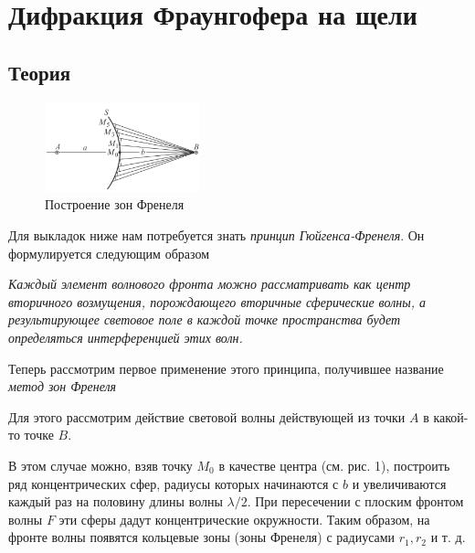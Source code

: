 \documentclass[a4paper, 12pt]{article}%
\begin{document}
\section{Дифракция Фраунгофера на щели}
\subsection*{Теория}
\begin{figure}
  \begin{center}
    \includegraphics[width = 0.4\textwidth]{2.png}
  \end{center}
  \caption{Построение зон Френеля}
\end{figure}
Для выкладок ниже нам потребуется знать \textit{принцип Гюйгенса-Френеля}. Он формулируется следующим образом

\textit{Каждый элемент волнового фронта можно рассматривать как центр  вторичного возмущения, порождающего вторичные сферические волны, а результирующее световое поле  в каждой точке пространства будет определяться интерференцией этих волн.}

Теперь рассмотрим первое применение этого принципа, получившее название \textit{метод зон Френеля}

Для этого рассмотрим действие световой волны действующей из точки $A$ в какой-то точке $B$.

В этом случае можно, взяв точку $M_0$ в качестве центра (см. рис. 1), построить ряд концентрических сфер, радиусы которых начинаются с $b$ и увеличиваются каждый раз на половину длины волны $\lambda/2$. При пересечении с плоским фронтом волны $F$ эти сферы дадут концентрические окружности. Таким образом, на фронте волны появятся кольцевые зоны (зоны Френеля) с радиусами $r_1, r_2$ и т. д.
\end{document}
